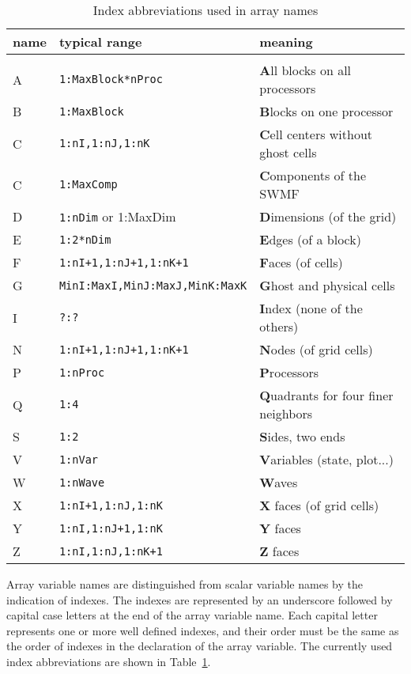 \documentclass{article}
\begin{document}
\begin{table}
\caption{Index abbreviations used in array names}
\begin{center}
\begin{tabular}{lll}
name &   typical range                 &  meaning \\
\hline \\
A    & {\tt 1:MaxBlock*nProc}          &  \textbf{A}ll blocks on all processors \\
B    & {\tt 1:MaxBlock}                &  \textbf{B}locks on one processor \\
C    & {\tt 1:nI,1:nJ,1:nK}            &  \textbf{C}ell centers without ghost cells \\
C    & {\tt 1:MaxComp}                 &  \textbf{C}omponents of the SWMF \\
D    & {\tt 1:nDim} or {1:MaxDim}      &  \textbf{D}imensions (of the grid) \\
E    & {\tt 1:2*nDim}                  &  \textbf{E}dges (of a block) \\
F    & {\tt 1:nI+1,1:nJ+1,1:nK+1}      &  \textbf{F}aces (of cells) \\
G & {\tt MinI:MaxI,MinJ:MaxJ,MinK:MaxK} & \textbf{G}host and physical cells \\
I    & {\tt ?:?}                       &  \textbf{I}ndex (none of the others) \\
N    & {\tt 1:nI+1,1:nJ+1,1:nK+1}      &  \textbf{N}odes (of grid cells) \\
P    & {\tt 1:nProc}                   &  \textbf{P}rocessors \\
Q    & {\tt 1:4}                       &  \textbf{Q}uadrants for four finer neighbors\\
S    & {\tt 1:2}                       &  \textbf{S}ides, two ends \\
V    & {\tt 1:nVar}                    &  \textbf{V}ariables (state, plot...) \\
W    & {\tt 1:nWave}                   &  \textbf{W}aves \\
X    & {\tt 1:nI+1,1:nJ,1:nK}          &  \textbf{X} faces (of grid cells) \\
Y    & {\tt 1:nI,1:nJ+1,1:nK}          &  \textbf{Y} faces \\
Z    & {\tt 1:nI,1:nJ,1:nK+1}          &  \textbf{Z} faces
\end{tabular}
\end{center}
\label{tab:index}
\end{table}
Array variable names are distinguished from scalar variable names
by the indication of indexes. The indexes are represented by 
an underscore followed by capital case letters at the end 
of the array variable name. Each capital letter represents
one or more well defined indexes, and their order must be the
same as the order of indexes in the declaration of the array variable.
The currently used index abbreviations are shown in Table~\ref{tab:index}.
\end{document}
